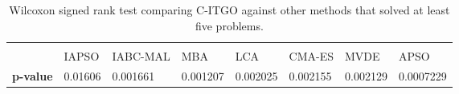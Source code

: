 \begin{table*}[h]
    \tiny
    \begin{center}
    
    \begin{tabular}{ P{1.0cm} P{1.0cm} P{1.2cm} P{1.0cm} P{1.0cm} P{1.0cm} P{1.0cm} P{1.0cm} }
                     &         &          &          &          &         &           &         \\[2em]
                     &  IAPSO  & IABC-MAL &    MBA   &    LCA   & CMA-ES  &   MVDE    & APSO    \\[1em]
    \rule{0pt}{3ex}
    \textbf{p-value} & 0.01606 & 0.001661 & 0.001207 & 0.002025 & 0.002155 & 0.002129 & 0.0007229 \\


    \end{tabular}
    \end{center}
    \vspace*{-4mm}
    \captionsetup{justification=centering}
    \caption{Wilcoxon signed rank test comparing C-ITGO against other methods that solved at least five problems. \\[2em]}
    \label{tab:Wilcoxon}
\end{table*}